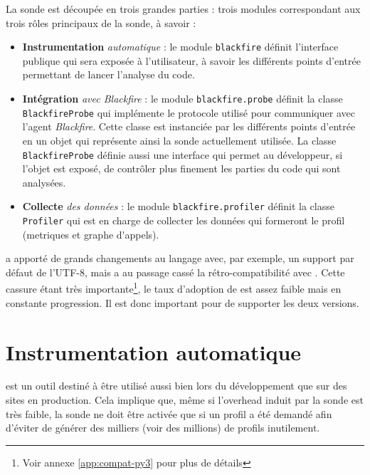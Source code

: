 La sonde est découpée en trois grandes parties : trois modules correspondant aux trois rôles principaux de la sonde, à savoir :
\begin{itemize}
\item \textbf{Instrumentation} \emph{automatique} : le module \texttt{blackfire} définit l'interface publique qui sera exposée à l'utilisateur, à savoir les différents points d'entrée permettant de lancer l'analyse du code.
\item \textbf{Intégration} \emph{avec Blackfire} : le module \texttt{blackfire.probe} définit la classe \\\texttt{BlackfireProbe} qui implémente le protocole utilisé pour communiquer avec l'agent \emph{Blackfire}. Cette classe est instanciée par les différents points d'entrée en un objet qui représente ainsi la sonde actuellement utilisée. La classe \texttt{BlackfireProbe} définie aussi une interface qui permet au développeur, si l'objet est exposé, de contrôler plus finement les parties du code qui sont analysées.
\item \textbf{Collecte} \emph{des données} : le module \texttt{blackfire.profiler} définit la classe \texttt{Profiler} qui est en charge de collecter les données qui formeront le profil (\glspl{metrique} et \gls{graphe d'appels}).
\end{itemize}

\begin{note}[Python 3]
 a apporté de grands changements au langage avec, par exemple, un support par défaut de l'UTF-8, mais a au passage cassé la rétro-compatibilité avec . Cette cassure étant très importante\footnote{Voir annexe \vref{app:compat-py3} pour plus de détails}, le taux d'adoption de  est assez faible mais en constante progression. Il est donc important pour \Blackfire de supporter les deux versions.
\end{note}

  \chapter[Instrumentation]{Instrumentation automatique}
\Blackfire est un outil destiné à être utilisé aussi bien lors du développement que sur des sites en production. Cela implique que, même si l'\gls{overhead} induit par la sonde est très faible, la sonde ne doit être activée que si un profil a été demandé afin d'éviter de générer des milliers (voir des millions) de profils inutilement.

